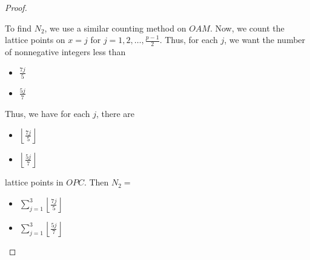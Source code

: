 \documentclass[letterpaper, 11 pt]{article}
\begin{document}
\begin{proof}
\begin{example}
To find $N_2$, we use a similar counting method on $OAM$. Now, we count the lattice points on $x=j$ for $j=1,2,\dots,\frac{p-1}{2}$. Thus, for each $j$, we want the number of nonnegative integers less than \begin{poll} \begin{itemize}
 \item{$\frac{7j}{5}$}
 \item   {$\frac{5j}{7}$}
\end{itemize} \end{poll}
 Thus, we have for each $j$, there are  \begin{poll} \begin{itemize}
 \item{$\left\lfloor\frac{7j}{5}\right\rfloor$}
 \item  {$\left\lfloor\frac{5j}{7}\right\rfloor$}
\end{itemize} \end{poll}
lattice points in $OPC$. Then $N_2=$
 \begin{poll} \begin{itemize}
 \item  {$\sum_{j=1}^{3
}\left\lfloor\frac{7j}{5}\right\rfloor$}
 \item {$\sum_{j=1}^{3
}\left\lfloor\frac{5j}{7}\right\rfloor$}
\end{itemize} \end{poll}

 \end{example}
 

\end{proof}
\end{document}
